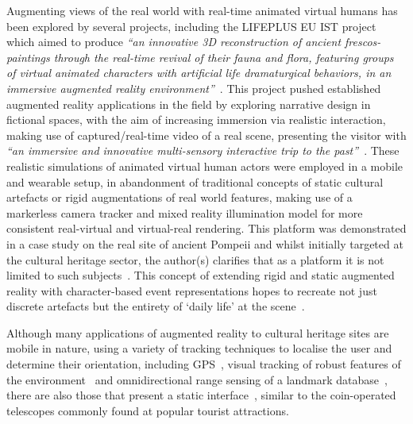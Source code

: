 Augmenting views of the real world with real-time animated virtual humans has been explored by several projects, including the LIFEPLUS EU IST project which aimed to produce \textit{``an innovative 3D reconstruction of ancient frescos-paintings through the real-time revival of their fauna and flora, featuring groups of virtual animated characters with artificial life dramaturgical behaviors, in an immersive augmented reality environment''}~\cite{Papagiannakis2004}. This project pushed established augmented reality applications in the field by exploring narrative design in fictional spaces, with the aim of increasing immersion via realistic interaction, making use of captured/real-time video of a real scene, presenting the visitor with \textit{``an immersive and innovative multi-sensory interactive trip to the past''}~\cite{Papagiannakis2005}. These realistic simulations of animated virtual human actors were employed in a mobile and wearable setup, in abandonment of traditional concepts of static cultural artefacts or rigid augmentations of real world features, making use of a markerless camera tracker and mixed reality illumination model for more consistent real-virtual and virtual-real rendering. This platform was demonstrated in a case study on the real site of ancient Pompeii and whilst initially targeted at the cultural heritage sector, the author(s) clarifies that as a platform it is not limited to such subjects~\cite{Papagiannakis2007}. This concept of extending rigid and static augmented reality with character-based event representations hopes to recreate not just discrete artefacts but the entirety of `daily life' at the scene~\cite{Papagiannakis2009}.

Although many applications of augmented reality to cultural heritage sites are mobile in nature, using a variety of tracking techniques to localise the user and determine their orientation, including GPS~\cite{vlahakis:archeoguide}, visual tracking of robust features of the environment~\cite{Kim2009} and omnidirectional range sensing of a landmark database~\cite{Taketomi2011}, there are also those that present a static interface~\cite{Weng2012}, similar to the coin-operated telescopes commonly found at popular tourist attractions.


